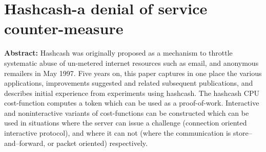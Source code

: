 \section{Hashcash-a denial of service counter-measure}

\textbf{Abstract:} Hashcash was originally proposed as a mechanism to throttle systematic abuse of un-metered internet resources such as email, and anonymous remailers in May 1997. Five years on, this paper captures in one place the various applications, improvements suggested and related subsequent publications, and describes initial experience from experiments using hashcash. The hashcash CPU cost-function computes a token which can be used as a proof-of-work. Interactive and noninteractive variants of cost-functions can be constructed which can be used in situations where the server can issue a challenge (connection oriented interactive protocol), and where it can not (where the communication is store–and–forward, or packet oriented) respectively.
